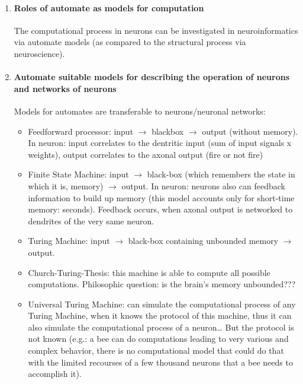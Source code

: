 \documentclass[12pt,article,oneside,a4paper]{memoir}
\begin{document}
\begin{enumerate}
\item \paragraph{Roles of automate as models for computation}

The computational process in neurons can be investigated in neuroinformatics via automate models (as compared to the structural process via neuroscience).

\item \paragraph{Automate suitable models for describing the operation of neurons and networks of neurons}

Models for automates are transferable to neurons/neuronal networks:
\begin{itemize}
\item Feedforward processor: input $\rightarrow$ blackbox $\rightarrow$ output (without memory). In neuron: input correlates to the dentritic input (sum of input signals x weights), output correlates to the axonal output (fire or not fire)
\item Finite State Machine: input $\rightarrow$ black-box (which remembers the state in which it is, memory) $\rightarrow$ output. In neuron: neurons also can feedback information to build up memory (this model accounts only for short-time memory: seconds). Feedback occurs, when axonal output is networked to dendrites of the very same neuron.
\item Turing Machine: input $\rightarrow$ black-box containing unbounded memory $\rightarrow$ output.
\item Church-Turing-Thesis: this machine is able to compute all possible computations. Philosophic question: is the brain’s memory unbounded???
\item Universal Turing Machine: can simulate the computational process of any Turing Machine, when it knows the protocol of this machine, thus it can also simulate the computational process of a neuron… But the protocol is not known (e.g.: a bee can do computations leading to very various and complex behavior, there is no computational model that could do that with the limited recourses of a few thousand neurons that a bee needs to accomplish it).
\end{itemize}
	

\end{enumerate}
\end{document}
